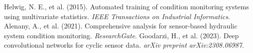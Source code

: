 \documentclass[sigconf]{acmart}
\begin{document}

\begin{thebibliography}{9}
     Helwig, N. E., et al. (2015). Automated training of condition monitoring systems using multivariate statistics. \textit{IEEE Transactions on Industrial Informatics}.
     Alenany, A., et al. (2021). Comprehensive analysis for sensor-based hydraulic system condition monitoring. \textit{ResearchGate}.
     Goodarzi, H., et al. (2023). Deep convolutional networks for cyclic sensor data. \textit{arXiv preprint arXiv:2308.06987}.
\end{thebibliography}
\end{document}
